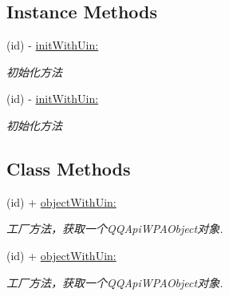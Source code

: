 \subsection*{Instance Methods}
\begin{DoxyCompactItemize}
\item 
\mbox{\label{interface_q_q_api_w_p_a_object_aa6c09f3703e911877d9c84ec8f6704ed}} 
(id) -\/ \mbox{\hyperlink{interface_q_q_api_w_p_a_object_aa6c09f3703e911877d9c84ec8f6704ed}{init\+With\+Uin\+:}}
\begin{DoxyCompactList}\small\item\em 初始化方法 \end{DoxyCompactList}\item 
\mbox{\label{interface_q_q_api_w_p_a_object_aa6c09f3703e911877d9c84ec8f6704ed}} 
(id) -\/ \mbox{\hyperlink{interface_q_q_api_w_p_a_object_aa6c09f3703e911877d9c84ec8f6704ed}{init\+With\+Uin\+:}}
\begin{DoxyCompactList}\small\item\em 初始化方法 \end{DoxyCompactList}\end{DoxyCompactItemize}
\subsection*{Class Methods}
\begin{DoxyCompactItemize}
\item 
\mbox{\label{interface_q_q_api_w_p_a_object_a91f8899dba00f24b4d0aabad5b29538a}} 
(id) + \mbox{\hyperlink{interface_q_q_api_w_p_a_object_a91f8899dba00f24b4d0aabad5b29538a}{object\+With\+Uin\+:}}
\begin{DoxyCompactList}\small\item\em 工厂方法，获取一个\+Q\+Q\+Api\+W\+P\+A\+Object对象. \end{DoxyCompactList}\item 
\mbox{\label{interface_q_q_api_w_p_a_object_a91f8899dba00f24b4d0aabad5b29538a}} 
(id) + \mbox{\hyperlink{interface_q_q_api_w_p_a_object_a91f8899dba00f24b4d0aabad5b29538a}{object\+With\+Uin\+:}}
\begin{DoxyCompactList}\small\item\em 工厂方法，获取一个\+Q\+Q\+Api\+W\+P\+A\+Object对象. \end{DoxyCompactList}\end{DoxyCompactItemize}
